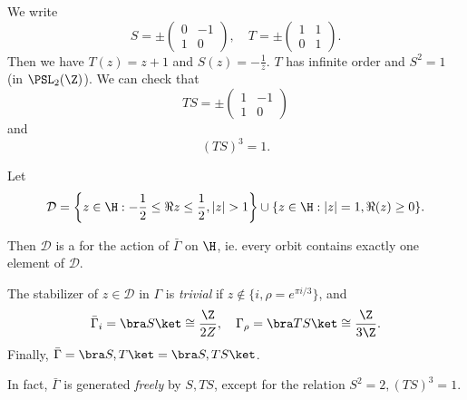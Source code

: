 \documentclass[a4paper]{article}
\begin{document}
We write
\[
  S = \pm
  \begin{pmatrix}
    0 & -1\\
    1 & 0
  \end{pmatrix},\quad
  T = \pm
  \begin{pmatrix}
    1 & 1\\
    0 & 1
  \end{pmatrix}.
\]
Then we have $T(z) = z + 1$ and $S(z) = -\frac{1}{z}$. $T$ has infinite order and $S^2 = 1$ (in $\PSL_2(\Z)$). We can check that
\[
  TS = \pm
  \begin{pmatrix}
    1 & -1\\
    1 & 0
  \end{pmatrix}
\]
and
\[
  (TS)^3 = 1.
\]
\begin{thm}
  Let
  \[
    \mathcal{D} = \left\{z \in \H: -\frac{1}{2} \leq \Re z \leq \frac{1}{2}, |z| > 1\right\} \cup \{z \in \H: |z| = 1, \Re(z) \geq 0\}.
  \]
  \begin{center}
  \end{center}
  Then $\mathcal{D}$ is a  for the action of $\bar{\Gamma}$ on $\H$, ie. every orbit contains exactly one element of $\mathcal{D}$.

  The stabilizer of $z \in \mathcal{D}$ in $\Gamma$ is \emph{trivial} if $z \not\in \{i, \rho = e^{\pi i/3}\}$, and
  \[
    \bar{\Gamma}_i = \bra S\ket \cong \frac{\Z}{2Z},\quad \Gamma_\rho = \bra TS\ket \cong \frac{\Z}{3\Z}.
  \]
  Finally, $\bar \Gamma = \bra S, T \ket = \bra S, TS\ket$.
\end{thm}
In fact, $\bar\Gamma$ is generated \emph{freely} by $S, TS$, except for the relation $S^2 = 2, (TS)^3 = 1$.
\end{document}
